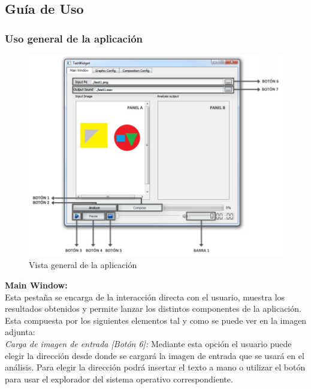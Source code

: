 \subsection{Guía de Uso}

	\subsubsection{Uso general de la aplicación}
		
		\begin{figure}[hp]
		\centering
		\hspace*{-0.9in}
		\includegraphics[scale=0.57]{graphics/interfaz.png}
		\caption{Vista general de la aplicación}
		\label{fig:interfaz}
		\end{figure}

		\vspace{0.2in}\noindent\textbf{Main Window:}
		\vspace{0.2in}\\Esta pestaña se encarga de la interacción directa con el usuario, muestra los resultados obtenidos y permite lanzar los distintos componentes de la aplicación. 
		\\Esta compuesta por los siguientes elementos tal y como se puede ver en la imagen adjunta:\\
		
		\noindent\textit{Carga de imagen de entrada [Botón 6]:}  Mediante esta opción el usuario puede elegir la dirección desde donde se cargará la imagen de entrada que se usará en el análisis. Para elegir la dirección podrá insertar el texto a mano o utilizar el botón para usar el explorador del sistema operativo correspondiente.\\
		
